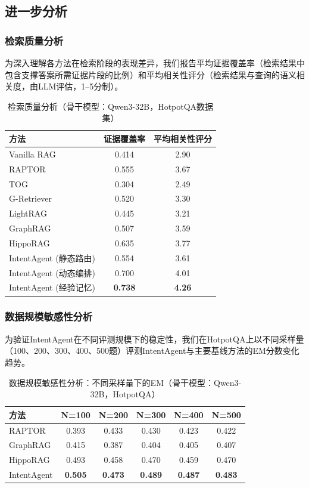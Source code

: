 \documentclass[runningheads]{llncs}
\begin{document}
\subsection{进一步分析}

\subsubsection{检索质量分析}

为深入理解各方法在检索阶段的表现差异，我们报告平均证据覆盖率（检索结果中包含支撑答案所需证据片段的比例）和平均相关性评分（检索结果与查询的语义相关度，由LLM评估，1--5分制）。

\begin{table}[htbp]
\centering
\caption{检索质量分析（骨干模型：Qwen3-32B，HotpotQA数据集）}
\label{tab:retrieval_quality}
\begin{tabular}{l|cc}
\toprule
\textbf{方法} & \textbf{证据覆盖率} & \textbf{平均相关性评分} \\
\midrule
Vanilla RAG & 0.414 & 2.90 \\
RAPTOR & 0.555 & 3.67 \\
TOG & 0.304 & 2.49 \\
G-Retriever & 0.520 & 3.30 \\
LightRAG & 0.445 & 3.21 \\
GraphRAG & 0.507 & 3.59 \\
HippoRAG & 0.635 & 3.77 \\
\midrule
IntentAgent (静态路由) & 0.554 & 3.61 \\
IntentAgent (动态编排) & 0.700 & 4.01 \\
IntentAgent (经验记忆) & \textbf{0.738} & \textbf{4.26} \\
\bottomrule
\end{tabular}
\end{table}

\subsubsection{数据规模敏感性分析}

为验证IntentAgent在不同评测规模下的稳定性，我们在HotpotQA上以不同采样量（100、200、300、400、500题）评测IntentAgent与主要基线方法的EM分数变化趋势。

\begin{table}[htbp]
\centering
\caption{数据规模敏感性分析：不同采样量下的EM（骨干模型：Qwen3-32B，HotpotQA）}
\label{tab:scale_sensitivity}
\begin{tabular}{l|ccccc}
\toprule
\textbf{方法} & \textbf{N=100} & \textbf{N=200} & \textbf{N=300} & \textbf{N=400} & \textbf{N=500} \\
\midrule
RAPTOR & 0.393 & 0.433 & 0.430 & 0.423 & 0.422 \\
GraphRAG & 0.415 & 0.387 & 0.404 & 0.405 & 0.407 \\
HippoRAG & 0.493 & 0.458 & 0.470 & 0.459 & 0.470 \\
IntentAgent & \textbf{0.505} & \textbf{0.473} & \textbf{0.489} & \textbf{0.487} & \textbf{0.483} \\
\bottomrule
\end{tabular}
\end{table}
\end{document}
